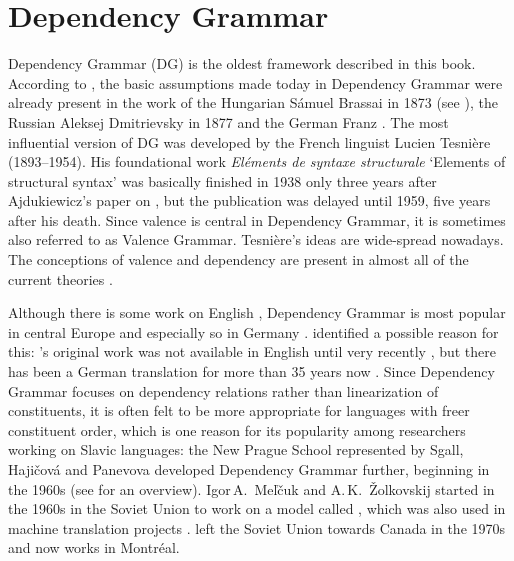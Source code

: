 \chapter{Dependency Grammar}
\label{Kapitel-DG}

Dependency Grammar (DG) is the oldest framework described in this book. According to
\citet[]{Hudson2021a}, the basic assumptions made today in Dependency Grammar were already present in
the work of the Hungarian Sámuel Brassai in 1873 (see \citealp{Imrenyi2013a}), the Russian Aleksej Dmitrievsky in 1877 and the German Franz
\citet{Kern1884a-u}. The most influential version of DG was developed by the
French linguist Lucien Tesnière (1893--1954). His foundational work \emph{Eléments de syntaxe
  structurale} `Elements of structural syntax' was basically finished in 1938 only three years after
Ajdukiewicz's paper on \cg \citeyearpar{Ajdukiewicz35a-u}, but the publication
was delayed until 1959, five years after his death\nocite{Tesniere59a-u}. Since valence is central
in Dependency Grammar, it is sometimes also referred to as Valence Grammar. 
Tesnière's ideas are wide-spread nowadays. The conceptions of valence and dependency are present in
almost all of the current theories \citep[--263, 284]{AF2010a}.

Although there is some work on English \citep{Anderson71a-u,Hudson84a-u}, Dependency Grammar is most popular in central Europe and especially so in Germany \citep[--57]{Engel96a}. \citet[]{AF2010a} identified a possible reason for this: \tes's
original work was not available in English until very recently \citep{Tesniere2015a-u}, but there has
been a German translation for more than 35 years now \citep{Tesniere80a-u}. Since Dependency Grammar focuses on dependency relations rather than
linearization of constituents, it is often felt to be more appropriate for languages with freer
constituent order, which is one reason for its popularity among researchers working on Slavic
languages: the New Prague School represented by Sgall, Hajičová and Panevova developed Dependency Grammar further,
beginning in the 1960s (see \citealp{HS2003a-u} for an overview).  Igor\,A.\ Meľčuk and
A.\,K.\ Žolkovskij started in the 1960s in the Soviet Union to work on a model called \mtt, which was also used in machine
translation projects \citep{Melcuk64a-u,Melcuk81a,Melcuk88a-u,Kahane2003a-u}. \mel left the
Soviet Union towards Canada in the 1970s and now works in Montréal. 

